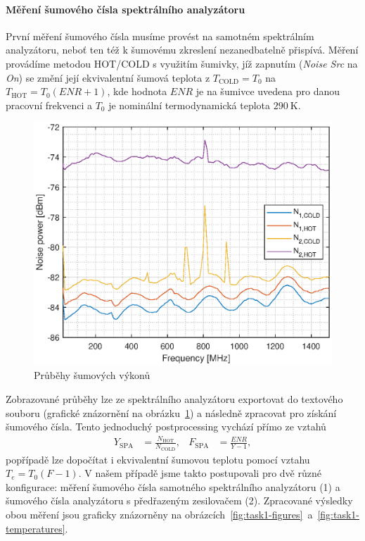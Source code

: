 \documentclass[11pt,a4paper]{article}
\begin{document}
\paragraph*{Měření šumového čísla spektrálního analyzátoru} První měření šumového čísla musíme provést na samotném spektrálním analyzátoru, neboť ten též k šumovému zkreslení nezanedbatelně přispívá. Měření provádíme metodou HOT/COLD s využitím šumivky, jíž zapnutím (\emph{Noise Src} na \emph{On}) se změní její ekvivalentní šumová teplota z $T_{\mathrm{COLD}} = T_0$ na $T_{\mathrm{HOT}} = T_0(ENR + 1)$, kde hodnota $ENR$ je na šumivce uvedena pro danou pracovní frekvenci a $T_0$ je nominální termodynamická teplota $290 \ \mathrm K$.

\begin{figure}[!ht]
    \centering
    \includegraphics[width=.65\textwidth]{src/task1_powers.eps}
    \caption{Průběhy šumových výkonů}
    \label{fig:task1-powers}
\end{figure}
Zobrazované průběhy lze ze spektrálního analyzátoru exportovat do textového souboru (grafické znázornění na obrázku~\ref{fig:task1-powers}) a následně zpracovat pro získání šumového čísla. Tento jednoduchý postprocessing vychází přímo ze vztahů
\begin{align}
    Y_{\mathrm{SPA}} &= \frac{N_{\mathrm{HOT}}}{N_{\mathrm{COLD}}},
&
    F_{\mathrm{SPA}} &= \frac{ENR}{Y-1},
\end{align}
popřípadě lze dopočítat i ekvivalentní šumovou teplotu pomocí vztahu $T_e = T_0(F-1)$. V našem případě jsme takto postupovali pro dvě různé konfigurace: měření šumového čísla samotného spektrálního analyzátoru (1) a šumového čísla analyzátoru s předřazeným zesilovačem (2). Zpracované výsledky obou měření jsou graficky znázorněny na obrázcích~\ref{fig:task1-figures}~a~\ref{fig:task1-temperatures}.
\end{document}

